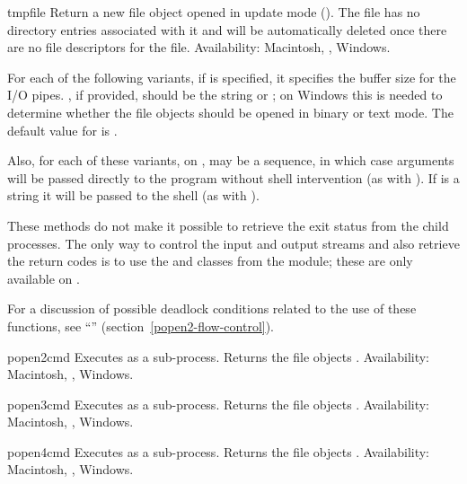 \begin{funcdesc}{tmpfile}{}
Return a new file object opened in update mode ().  The file
has no directory entries associated with it and will be automatically
deleted once there are no file descriptors for the file.
Availability: Macintosh, \UNIX, Windows.
\end{funcdesc}


For each of the following  variants, if  is
specified, it specifies the buffer size for the I/O pipes.
, if provided, should be the string  or
; on Windows this is needed to determine whether the file
objects should be opened in binary or text mode.  The default value
for  is .

Also, for each of these variants, on \UNIX,  may be a sequence, in
which case arguments will be passed directly to the program without shell
intervention (as with ). If  is a string it will
be passed to the shell (as with ).

These methods do not make it possible to retrieve the exit status from
the child processes.  The only way to control the input and output
streams and also retrieve the return codes is to use the
 and  classes from the 
module; these are only available on \UNIX.

For a discussion of possible deadlock conditions related to the use
of these functions, see ``''
(section~\ref{popen2-flow-control}).

\begin{funcdesc}{popen2}{cmd}
Executes  as a sub-process.  Returns the file objects
.
Availability: Macintosh, \UNIX, Windows.
\end{funcdesc}

\begin{funcdesc}{popen3}{cmd}
Executes  as a sub-process.  Returns the file objects
.
Availability: Macintosh, \UNIX, Windows.
\end{funcdesc}

\begin{funcdesc}{popen4}{cmd}
Executes  as a sub-process.  Returns the file objects
.
Availability: Macintosh, \UNIX, Windows.
\end{funcdesc}

